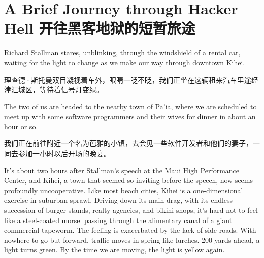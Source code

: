 

\chapter{\ifdefined\eng
A Brief Journey through Hacker Hell
\fi
\ifdefined\chs
开往黑客地狱的短暂旅途
\fi
}

\ifdefined{}
\fi

\ifdefined{}
\fi


\ifdefined\eng
Richard Stallman stares, unblinking, through the windshield of a rental car, waiting for the light to change as we make our way through downtown Kihei.
\fi

\ifdefined\chs
理查德·斯托曼双目凝视着车外，眼睛一眨不眨，我们正坐在这辆租来汽车里途经津汇城区，等待着信号灯变绿。
\fi

\ifdefined\eng
The two of us are headed to the nearby town of Pa'ia, where we are scheduled to meet up with some software programmers and their wives for dinner in about an hour or so.
\fi

\ifdefined\chs
我们正在前往附近一个名为芭雅的小镇，去会见一些软件开发者和他们的妻子，一同去参加一小时以后开场的晚宴。
\fi

\ifdefined\eng
It's about two hours after Stallman's speech at the Maui High Performance Center, and Kihei, a town that seemed so inviting before the speech, now seems profoundly uncooperative. Like most beach cities, Kihei is a one-dimensional exercise in suburban sprawl. Driving down its main drag, with its endless succession of burger stands, realty agencies, and bikini shops, it's hard not to feel like a steel-coated morsel passing through the alimentary canal of a giant commercial tapeworm. The feeling is exacerbated by the lack of side roads. With nowhere to go but forward, traffic moves in spring-like lurches. 200 yards ahead, a light turns green. By the time we are moving, the light is yellow again.
\fi

